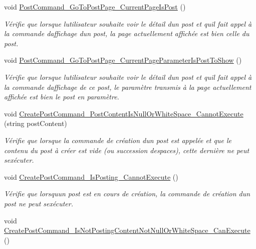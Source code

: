 \begin{DoxyCompactItemize}
void \hyperlink{class_boxes_1_1_tests_1_1_box_view_model_tests_ace920ab76de14f39da3c4fe16033419f}{Post\+Command\+\_\+\+Go\+To\+Post\+Page\+\_\+\+Current\+Page\+Is\+Post} ()
\begin{DoxyCompactList}\small\item\em Vérifie que lorsque l\textquotesingle{}utilisateur souhaite voir le détail d\textquotesingle{}un post et qu\textquotesingle{}il fait appel à la commande d\textquotesingle{}affichage d\textquotesingle{}un post, la page actuellement affichée est bien celle du post. \end{DoxyCompactList}\item 
void \hyperlink{class_boxes_1_1_tests_1_1_box_view_model_tests_a1de62d7f0aba07485744808f5b45713d}{Post\+Command\+\_\+\+Go\+To\+Post\+Page\+\_\+\+Current\+Page\+Parameter\+Is\+Post\+To\+Show} ()
\begin{DoxyCompactList}\small\item\em Vérifie que lorsque l\textquotesingle{}utilisateur souhaite voir le détail d\textquotesingle{}un post et qu\textquotesingle{}il fait appel à la commande d\textquotesingle{}affichage de ce post, le paramètre transmis à la page actuellement affichée est bien le post en paramètre. \end{DoxyCompactList}\item 
void \hyperlink{class_boxes_1_1_tests_1_1_box_view_model_tests_a5f955c1e3b22af4d7f87fad58fd5c22e}{Create\+Post\+Command\+\_\+\+Post\+Content\+Is\+Null\+Or\+White\+Space\+\_\+\+Cannot\+Execute} (string post\+Content)
\begin{DoxyCompactList}\small\item\em Vérifie que lorsque la commande de création d\textquotesingle{}un post est appelée et que le contenu du post à créer est vide (ou succession d\textquotesingle{}espaces), cette dernière ne peut s\textquotesingle{}exécuter. \end{DoxyCompactList}\item 
void \hyperlink{class_boxes_1_1_tests_1_1_box_view_model_tests_ac8700b19dd4b9da34ece813cc0a3315e}{Create\+Post\+Command\+\_\+\+Is\+Posting\+\_\+\+Cannot\+Execute} ()
\begin{DoxyCompactList}\small\item\em Vérifie que lorsqu\textquotesingle{}un post est en cours de création, la commande de création d\textquotesingle{}un post ne peut s\textquotesingle{}exécuter. \end{DoxyCompactList}\item 
void \hyperlink{class_boxes_1_1_tests_1_1_box_view_model_tests_a2ef7775cc88a525befef1e603fb84bbd}{Create\+Post\+Command\+\_\+\+Is\+Not\+Posting\+Content\+Not\+Null\+Or\+White\+Space\+\_\+\+Can\+Execute} ()

\end{DoxyCompactItemize}
